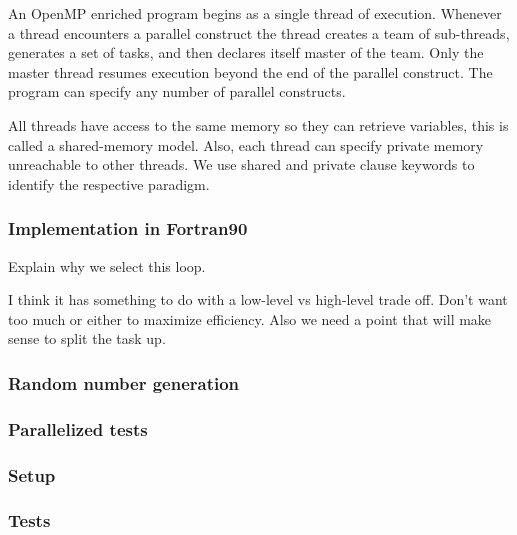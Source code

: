 An OpenMP enriched program begins as a single thread of execution.
Whenever a thread encounters a parallel construct the thread creates a team of sub-threads, generates a set of tasks, and then declares itself master of the team.
Only the master thread resumes execution beyond the end of the parallel construct.
The program can specify any number of parallel constructs.

All threads have access to the same memory so they can retrieve variables, this is called a shared-memory model.
Also, each thread can specify private memory unreachable to other threads.
We use shared and private clause keywords to identify the respective paradigm.

\subsubsection*{Implementation in Fortran90}
Explain why we select this loop. %

I think it has something to do with a low-level vs high-level trade off. Don't want too much or either to maximize efficiency. Also we need a point that will make sense to split the task up.


\subsubsection*{Random number generation}


\subsubsection*{Parallelized tests}

\subsubsection*{Setup}
\subsubsection*{Tests}
